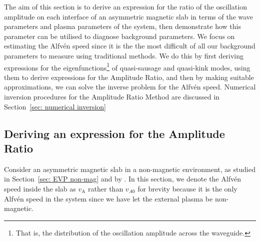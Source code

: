 \documentclass[12pt]{../style-files/ociamthesis}
\begin{document}
The aim of this section is to derive an expression for the ratio of the oscillation amplitude on each interface of an asymmetric magnetic slab in terms of the wave parameters and plasma parameters of the system, then demonstrate how this parameter can be utilised to diagnose background parameters. We focus on estimating the Alfv\'{e}n speed since it is the the most difficult of all our background parameters to measure using traditional methods. We do this by first deriving expressions for the eigenfunctions\footnote{That is, the distribution of the oscillation amplitude across the waveguide.} of quasi-sausage and quasi-kink modes, using them to derive expressions for the Amplitude Ratio, and then by making suitable approximations, we can solve the inverse problem for the Alfv\'{e}n speed. Numerical inversion procedures for the Amplitude Ratio Method are discussed in Section~\ref{sec: numerical inversion} 

\subsection{Deriving an expression for the Amplitude Ratio} \label{sec: amp ratio}

Consider an asymmetric magnetic slab in a non-magnetic environment, as studied in Section~\ref{sec: EVP non-mag} and by \cite{all_etal17}. In this section, we denote the Alfv\'{e}n speed inside the slab as $v_\textrm{A}$ rather than $v_{A0}$ for brevity because it is the only Alfv\'{e}n speed in the system since we have let the external plasma be non-magnetic.
\end{document}
